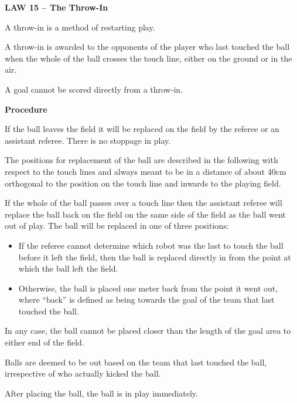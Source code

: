 \clearpage
\sffamily
{\bfseries
\textcolor[rgb]{0.4,0.4,0.4}{LAW 15 -- The Throw-In} }


\bigskip

A throw-in is a method of restarting play.

\bigskip

A throw-in is awarded to the opponents of the player who last touched
the ball when the whole of the ball crosses the touch line, either on
the ground or in the air.

\bigskip

A goal cannot be scored directly from a throw-in.

\bigskip

{\bfseries Procedure }

\headlinebox 

If the ball leaves the field it will be replaced on the field by the
referee or an assistant referee. There is no stoppage in play.

The positions for replacement of the ball are described in the
following with respect to the touch lines and always meant to be in a
distance of about 40cm orthogonal to the position on the touch line and
inwards to the playing field. 

If the whole of the ball passes over a touch line then the assistant
referee will replace the ball back on the field on the same side of the
field as the ball went out of play. The ball will be replaced in one of
three positions: 

\begin{itemize}
\item If the referee cannot determine which robot was the last to touch
the ball before it left the field, then the ball is replaced directly
in from the point at which the ball left the field. 
\item Otherwise, the ball is placed one meter back from the point it
went out, where ``back'' is defined as being towards the goal of the team that last touched the ball. 
\end{itemize}

In any case, the ball cannot be placed closer than the length of the
goal area to either end of the field. 

Balls are deemed to be out based on the team that last touched the ball,
irrespective of who actually kicked the ball.

After placing the ball, the ball is in play immediately.

